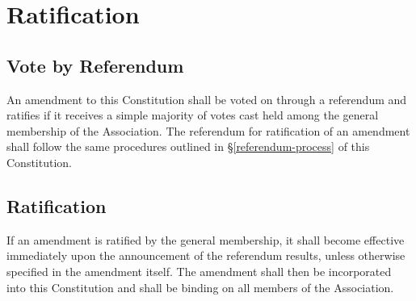 \section{Ratification}

\subsection{Vote by Referendum}
An amendment to this Constitution shall be voted on through a referendum 
and ratifies if it receives a simple majority of votes cast held among 
the general membership of the Association. The referendum for ratification 
of an amendment shall follow the same procedures outlined in 
\S\ref{referendum-process} of this Constitution.

\subsection{Ratification}
If an amendment is ratified by the general membership, it shall become
effective immediately upon the announcement of the referendum results, unless
otherwise specified in the amendment itself. The amendment shall then be incorporated
into this Constitution and shall be binding on all members of the Association.

